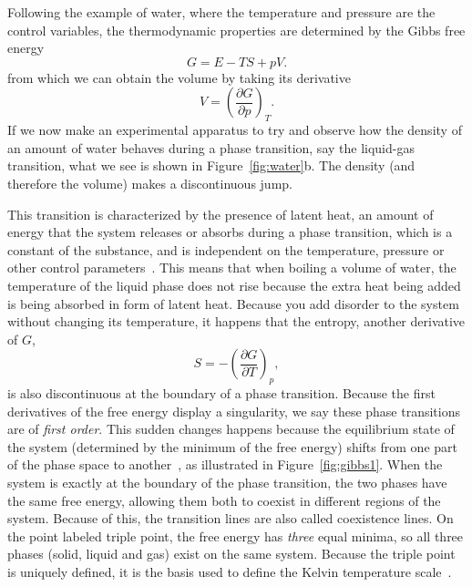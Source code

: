 

Following the example of water, where the temperature and pressure are the
control variables, the thermodynamic properties are determined by the Gibbs
free energy
\begin{equation}
    G=E-TS+pV.
\end{equation}
from which we can obtain the volume by taking its derivative
\begin{equation}
    V={\left(\frac{\partial G}{\partial p}\right)}_T.
\end{equation}
If we now make an experimental apparatus to try and observe how the density of
an amount of water behaves during a phase transition, say the liquid-gas
transition, what we see is shown in Figure~\ref{fig:water}b. The density (and
therefore the volume) makes a discontinuous jump.

This transition is characterized by the presence of latent heat, an amount of
energy that the system releases or absorbs during a phase transition, which is
a constant of the substance, and is independent on the temperature, pressure or
other control parameters~\cite{Callen1985}. This means that when boiling a
volume of water, the temperature of the liquid phase does not rise because the
extra heat being added is being absorbed in form of latent heat. Because you
add disorder to the system without changing its temperature, it happens that
the entropy, another derivative of $G$,
\begin{equation}
    S=-{\left(\frac{\partial G}{\partial T}\right)}_p,
\end{equation}
is also discontinuous at the boundary of a phase transition. Because the first
derivatives of the free energy display a singularity, we say these phase
transitions are of \textit{first order}. This sudden changes happens because the
equilibrium state of the system (determined by the minimum of the free energy)
shifts from one part of the phase space to another~\cite{Callen1985}, as
illustrated in Figure~\ref{fig:gibbs1}. When the system is exactly at the
boundary of the phase transition, the two phases have the same free energy,
allowing them both to coexist in different regions of the system. Because of
this, the transition lines are also called coexistence lines. On the point
labeled triple point, the free energy has \textit{three} equal minima, so all
three phases (solid, liquid and gas) exist on the same system. Because the
triple point is uniquely defined, it is the basis used to define the Kelvin
temperature scale~\cite{Fermi1956}.

